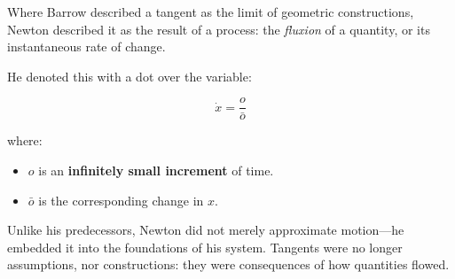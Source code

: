 Where Barrow described a tangent as the limit of geometric constructions, Newton described it as the result of a process: the \textit{fluxion} of a quantity, or its instantaneous rate of change.

He denoted this with a dot over the variable:

\[
\dot{x} = \frac{o}{\bar{o}}
\]

where:

\begin{itemize}
    \item \( o \) is an \textbf{infinitely small increment} of time.  
    \item \( \bar{o} \) is the corresponding change in \( x \).
\end{itemize}

Unlike his predecessors, Newton did not merely approximate motion—he embedded it into the foundations of his system. Tangents were no longer assumptions, nor constructions: they were consequences of how quantities flowed.


